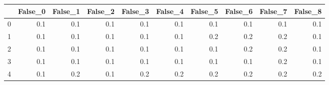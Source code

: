 \begin{tabular}{lrrrrrrrrr}
\toprule
{} &  False\_0 &  False\_1 &  False\_2 &  False\_3 &  False\_4 &  False\_5 &  False\_6 &  False\_7 &  False\_8 \\ \hline
\midrule
0 &      0.1 &      0.1 &      0.1 &      0.1 &      0.1 &      0.1 &      0.1 &      0.1 &      0.1 \\ \hline
1 &      0.1 &      0.1 &      0.1 &      0.1 &      0.1 &      0.2 &      0.2 &      0.2 &      0.1 \\ \hline
2 &      0.1 &      0.1 &      0.1 &      0.1 &      0.1 &      0.1 &      0.2 &      0.2 &      0.1 \\ \hline
3 &      0.1 &      0.1 &      0.1 &      0.1 &      0.1 &      0.1 &      0.1 &      0.2 &      0.1 \\ \hline
4 &      0.1 &      0.2 &      0.1 &      0.2 &      0.2 &      0.2 &      0.2 &      0.2 &      0.2 \\ \hline
\bottomrule
\end{tabular}
